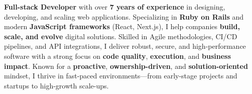 
\begin{cvparagraph}
\textbf{Full-stack Developer} with over \textbf{7 years of experience} in designing, developing, and scaling web applications. Specializing in \textbf{Ruby on Rails} and modern \textbf{JavaScript frameworks} (React, Next.js), I help companies \textbf{build, scale, and evolve} digital solutions. Skilled in Agile methodologies, CI/CD pipelines, and API integrations, I deliver robust, secure, and high-performance software with a strong focus on \textbf{code quality}, \textbf{execution}, and \textbf{business impact}. Known for a \textbf{proactive}, \textbf{ownership-driven}, and \textbf{solution-oriented} mindset, I thrive in fast-paced environments—from early-stage projects and startups to high-growth scale-ups.
\end{cvparagraph}
